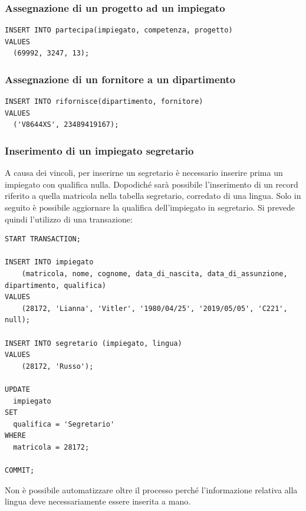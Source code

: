 \documentclass{article}
\begin{document}
\subsubsection{Assegnazione di un progetto ad un impiegato}
\begin{verbatim}
INSERT INTO partecipa(impiegato, competenza, progetto) 
VALUES 
  (69992, 3247, 13);
\end{verbatim}

\subsubsection{Assegnazione di un fornitore a un dipartimento}
\begin{verbatim}
INSERT INTO rifornisce(dipartimento, fornitore) 
VALUES 
  ('V8644XS', 23489419167);
\end{verbatim}

\subsubsection{Inserimento di un impiegato segretario}
A causa dei vincoli, per inserirne un segretario è necessario inserire prima un impiegato con qualifica nulla.
\newline
Dopodiché sarà possibile l'inserimento di un record riferito a quella matricola nella tabella segretario, corredato di una lingua.
\newline
Solo in seguito è possibile aggiornare la qualifica dell'impiegato in segretario.
\newline
\newline
Si prevede quindi l'utilizzo di una transazione:
\begin{verbatim}
START TRANSACTION;

INSERT INTO impiegato 
    (matricola, nome, cognome, data_di_nascita, data_di_assunzione, dipartimento, qualifica) 
VALUES 
	(28172, 'Lianna', 'Vitler', '1980/04/25', '2019/05/05', 'C221', null);

INSERT INTO segretario (impiegato, lingua) 
VALUES 
	(28172, 'Russo');

UPDATE 
  impiegato 
SET 
  qualifica = 'Segretario' 
WHERE 
  matricola = 28172;

COMMIT;
\end{verbatim}
Non è possibile automatizzare oltre il processo perché l'informazione relativa alla lingua deve necessariamente essere inserita a mano.
\end{document}
